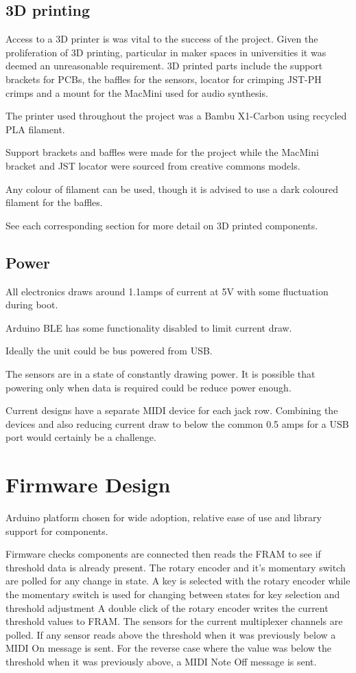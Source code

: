 \subsection{3D printing}\label{d-printing}

Access to a 3D printer is was vital to the success of the project. Given
the proliferation of 3D printing, particular in maker spaces in
universities it was deemed an unreasonable requirement. 3D printed parts
include the support brackets for PCBs, the baffles for the sensors,
locator for crimping JST-PH crimps and a mount for the MacMini used for
audio synthesis.

The printer used throughout the project was a Bambu X1-Carbon using
recycled PLA filament.

Support brackets and baffles were made for the project while the MacMini
bracket and JST locator were sourced from creative commons models.

Any colour of filament can be used, though it is advised to use a dark
coloured filament for the baffles.

See each corresponding section for more detail on 3D printed components.

\subsection{Power}\label{power}

All electronics draws around 1.1amps of current at 5V with some
fluctuation during boot.

Arduino BLE has some functionality disabled to limit current draw.

Ideally the unit could be bus powered from USB.

The sensors are in a state of constantly drawing power. It is possible
that powering only when data is required could be reduce power enough.

Current designs have a separate MIDI device for each jack row. Combining
the devices and also reducing current draw to below the common 0.5 amps
for a USB port would certainly be a challenge.

\section{Firmware Design}\label{firmware-design}

Arduino platform chosen for wide adoption, relative ease of use and
library support for components.

Firmware checks components are connected then reads the FRAM to see if
threshold data is already present. The rotary encoder and it's momentary
switch are polled for any change in state. A key is selected with the
rotary encoder while the momentary switch is used for changing between
states for key selection and threshold adjustment A double click of the
rotary encoder writes the current threshold values to FRAM. The sensors
for the current multiplexer channels are polled. If any sensor reads
above the threshold when it was previously below a MIDI On message is
sent. For the reverse case where the value was below the threshold when
it was previously above, a MIDI Note Off message is sent.

